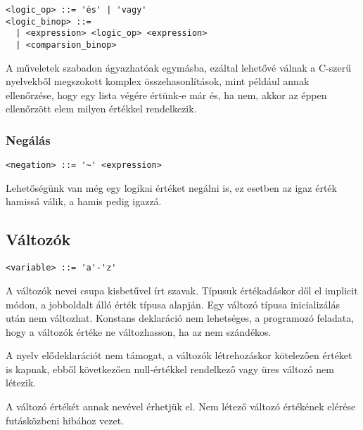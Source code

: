 \begin{footnotesize}
\begin{verbatim}
<logic_op> ::= 'és' | 'vagy'
<logic_binop> ::= 
  | <expression> <logic_op> <expression> 
  | <comparsion_binop>
\end{verbatim}
\end{footnotesize}


A műveletek szabadon ágyazhatóak egymásba, ezáltal lehetővé válnak a C-szerű nyelvekből megszokott komplex összehasonlítások, mint például annak ellenőrzése, hogy egy lista végére értünk-e már és, ha nem, akkor az éppen ellenőrzött elem milyen értékkel rendelkezik.

\subsubsection{Negálás}

\begin{footnotesize}
\begin{verbatim}
<negation> ::= '~' <expression>
\end{verbatim}
\end{footnotesize}

Lehetőségünk van még egy logikai értéket negálni is, ez esetben az igaz érték hamissá válik, a hamis pedig igazzá.

\subsection{Változók}

\begin{footnotesize}
\begin{verbatim}
<variable> ::= 'a'-'z'
\end{verbatim}
\end{footnotesize}

A változók nevei csupa kisbetűvel írt szavak. Típusuk értékadáskor dől el implicit módon, a jobboldalt álló érték típusa alapján. Egy változó típusa inicializálás után nem változhat. Konstans deklaráció nem lehetséges, a programozó feladata, hogy a változók értéke ne változhasson, ha az nem szándékos.

A nyelv elődeklarációt nem támogat, a változók létrehozáskor kötelezően értéket is kapnak, ebből következően null-értékkel rendelkező vagy üres változó nem létezik.

A változó értékét annak nevével érhetjük el. Nem létező változó értékének elérése futásközbeni hibához vezet.

